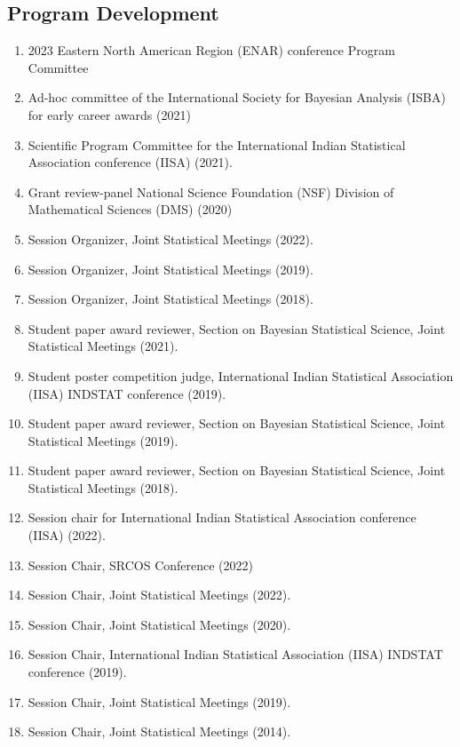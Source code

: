 \documentclass[12pt]{article}
\newcommand{\mydot}[1]{\begin{enumerate}[label=$\circ$,leftmargin=\parindent]\setlength{\itemsep}{#1}}
\newcommand{\ee}{\end{enumerate}}
\begin{document}
\subsection*{Program Development}

\mydot{-0.1em}
\item 2023 Eastern North American Region (ENAR) conference Program Committee 
\item Ad-hoc committee of the International Society for Bayesian Analysis (ISBA) for early career awards (2021)
\item Scientific Program Committee for the International Indian Statistical Association conference (IISA) (2021).
\item Grant review-panel National Science Foundation (NSF) Division of Mathematical Sciences (DMS) (2020)\\

\item Session Organizer, Joint Statistical Meetings (2022).
\item Session Organizer, Joint Statistical Meetings (2019).
\item Session Organizer, Joint Statistical Meetings (2018).\\

\item Student paper award reviewer, Section on Bayesian Statistical Science, Joint Statistical Meetings (2021).
\item Student poster competition judge, International Indian Statistical Association (IISA) INDSTAT conference (2019).
\item Student paper award reviewer, Section on Bayesian Statistical Science, Joint Statistical Meetings (2019).
\item Student paper award reviewer, Section on Bayesian Statistical Science, Joint Statistical Meetings (2018).\\

\item Session chair for International Indian Statistical Association conference (IISA) (2022).
\item Session Chair, SRCOS Conference (2022)
\item Session Chair, Joint Statistical Meetings (2022).
\item Session Chair, Joint Statistical Meetings (2020).
\item Session Chair, International Indian Statistical Association (IISA) INDSTAT conference (2019).
\item Session Chair, Joint Statistical Meetings (2019).
\item Session Chair, Joint Statistical Meetings (2014).
\ee
\end{document}
